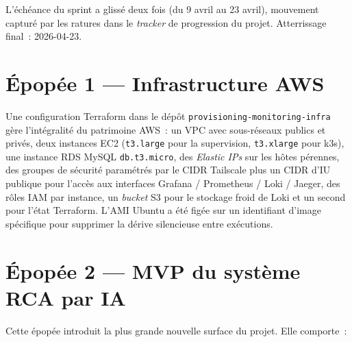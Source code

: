 \documentclass[11pt,a4paper,oneside]{report}
\begin{document}
L'échéance du sprint a glissé deux fois (du 9 avril au 23 avril),
mouvement capturé par les ratures dans le \emph{tracker} de
progression du projet. Atterrissage final~: 2026-04-23.

\section{Épopée 1 --- Infrastructure AWS}

Une configuration Terraform dans le dépôt
\texttt{provisioning-monitoring-infra} gère l'intégralité du
patrimoine AWS~: un VPC avec sous-réseaux publics et privés, deux
instances EC2 (\texttt{t3.large} pour la supervision,
\texttt{t3.xlarge} pour k3s), une instance RDS MySQL
\texttt{db.t3.micro}, des \emph{Elastic IPs} sur les hôtes
pérennes, des groupes de sécurité paramétrés par le CIDR Tailscale
plus un CIDR d'IU publique pour l'accès aux interfaces Grafana /
Prometheus / Loki / Jaeger, des rôles IAM par instance, un \emph{bucket}
S3 pour le stockage froid de Loki et un second pour l'état
Terraform. L'AMI Ubuntu a été figée sur un identifiant d'image
spécifique pour supprimer la dérive silencieuse entre exécutions.

\section{Épopée 2 --- MVP du système RCA par IA}

Cette épopée introduit la plus grande nouvelle surface du projet.
Elle comporte~:
\end{document}

